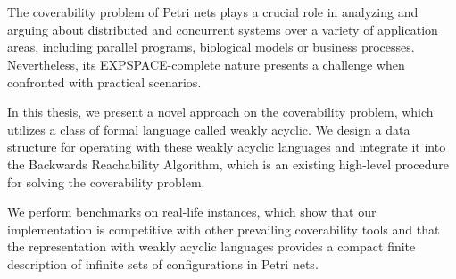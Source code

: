 \chapter{\abstractname}


The coverability problem of Petri nets plays a crucial role in analyzing and arguing about distributed and concurrent systems over a variety of application areas, including parallel programs, biological models or business processes. 
Nevertheless, its EXPSPACE-complete nature presents a challenge when confronted with practical scenarios. 

In this thesis, we present a novel approach on the coverability problem, which utilizes a class of formal language called weakly acyclic. We design a data structure for operating with these weakly acyclic languages and integrate it into the Backwards Reachability Algorithm, which is an existing high-level procedure for solving the coverability problem. 

We perform benchmarks on real-life instances, which show that our implementation is competitive with other prevailing coverability tools and that the representation with weakly acyclic languages provides a compact finite description of infinite sets of configurations in Petri nets. 